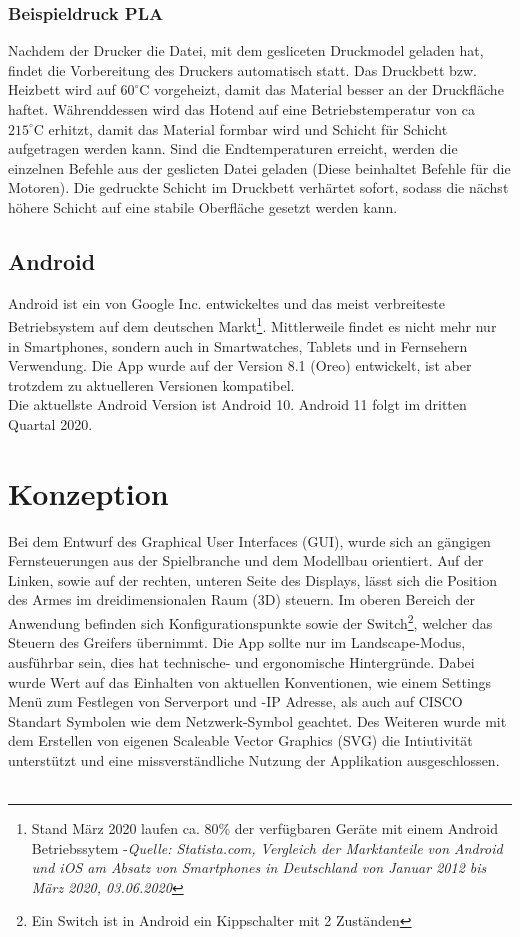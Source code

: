 \documentclass[12pt,					%
							 oneside,			%
							 a4paper,			%
							 halfparskip,		%
							 liststotoc,			%
							 bibtotoc,			%
							 fleqn,				%
							 pointlessnumbers]	%
							 {scrreprt}
\begin{document}
\subsection{Beispieldruck PLA}
Nachdem der Drucker die Datei, mit dem gesliceten Druckmodel geladen hat, findet die Vorbereitung des Druckers automatisch statt.
Das Druckbett bzw. Heizbett wird auf $60^\circ\text{C}$ vorgeheizt, damit das Material besser an der Druckfläche haftet.
Währenddessen wird das Hotend auf eine Betriebstemperatur von ca  $215^\circ\text{C}$ erhitzt, damit das Material formbar wird und Schicht für Schicht aufgetragen werden kann.
Sind die Endtemperaturen erreicht, werden die einzelnen Befehle aus der geslicten Datei geladen (Diese beinhaltet Befehle für die Motoren).
Die gedruckte Schicht im Druckbett verhärtet sofort, sodass die nächst höhere Schicht auf eine stabile Oberfläche gesetzt werden kann.
\section{Android}
Android ist ein von Google Inc. entwickeltes und das meist verbreiteste Betriebsystem auf dem deutschen Markt\footnote{Stand März 2020 laufen ca. 80\% der verfügbaren Geräte mit einem Android Betriebssytem -\textit{Quelle: Statista.com, \glqq{}Vergleich der Marktanteile von Android und iOS am Absatz von Smartphones in Deutschland von Januar 2012 bis März 2020\grqq{}, 03.06.2020}\cite{Tenzer2020}}. Mittlerweile findet es nicht mehr nur in Smartphones, sondern auch in Smartwatches, Tablets und in Fernsehern Verwendung. Die App wurde auf der Version 8.1 (Oreo) entwickelt, ist aber trotzdem zu aktuelleren Versionen kompatibel. \\
Die aktuellste Android Version ist Android 10. Android 11 folgt im dritten Quartal 2020.
\chapter{Konzeption}
Bei dem Entwurf des Graphical User Interfaces (GUI), wurde sich an gängigen Fernsteuerungen aus der Spielbranche und dem Modellbau orientiert. Auf der Linken, sowie auf der rechten, unteren Seite des Displays, lässt sich die Position des Armes im dreidimensionalen Raum (3D) steuern. Im oberen Bereich der Anwendung befinden sich Konfigurationspunkte sowie der \glqq{}Switch\grqq{}\footnote{Ein Switch ist in Android ein Kippschalter mit 2 Zuständen}, welcher das Steuern des Greifers übernimmt. Die App sollte nur im \glqq{}Landscape\grqq{}-Modus, ausführbar sein, dies hat technische- und ergonomische Hintergründe. Dabei wurde Wert auf das Einhalten von aktuellen Konventionen, wie einem Settings Menü zum Festlegen von Serverport und -IP Adresse, als auch auf CISCO Standart Symbolen wie dem Netzwerk-Symbol geachtet. Des Weiteren wurde mit dem Erstellen von eigenen Scaleable Vector Graphics (SVG) die Intiutivität unterstützt und eine missverständliche Nutzung der Applikation ausgeschlossen.\\ \\
\end{document}
